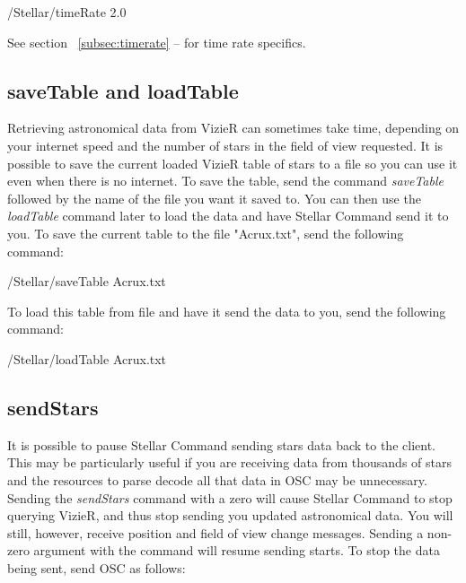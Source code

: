 \begin{syntax}	
	\medskip
	/Stellar/timeRate 2.0
	\medskip
\end{syntax}

See section ~\ref{subsec:timerate} --
\emph{} for time rate specifics.

\subsection{saveTable and loadTable}   
Retrieving astronomical data from VizieR can sometimes take time, depending on your internet speed and the number of stars in the field of view requested. It is possible to save the current loaded VizieR table of stars to a file so you can use it even when there is no internet. To save the table, send the command \textit{saveTable} followed by the name of the file you want it saved to. You can then use the \textit{loadTable} command later to load the data and have Stellar Command send it to you.
To save the current table to the file "Acrux.txt", send the following command:
 
 \begin{syntax}	
 	\medskip
 	/Stellar/saveTable Acrux.txt
 	\medskip
 \end{syntax}

To load this table from file and have it send the data to you, send the following command:
 \begin{syntax}	
	\medskip
	/Stellar/loadTable Acrux.txt
	\medskip
\end{syntax}

\subsection{sendStars} 
It is possible to pause Stellar Command sending stars data back to the client. This may be particularly useful if you are receiving data from thousands of stars and the resources to parse decode all that data in OSC may be unnecessary. Sending the \textit{sendStars} command with a zero will cause Stellar Command to stop querying VizieR, and thus stop sending you updated astronomical data. You will still, however, receive position and field of view change messages. Sending a non-zero argument with the command will resume sending starts. To stop the data being sent, send OSC as follows:

